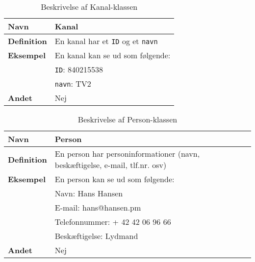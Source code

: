 \begin{table}[H]
    \begin{tabularx}{\textwidth}{|>{\RaggedRight}p{3cm}|>{\RaggedRight}X|}
        \hline
        \textbf{Navn} &  Kanal\\
        \hline
        \textbf{Definition} & En kanal har et \texttt{ID} og et \texttt{navn}\\
        \hline
        \textbf{Eksempel} & En kanal kan se ud som følgende: \\
                          & \texttt{ID}: 840215538\\
                          & \texttt{navn}: TV2\\
        \hline
        \textbf{Andet} & Nej\\
        \hline
    \end{tabularx}
    \caption{Beskrivelse af Kanal-klassen}
    \label{tab:channel_class_description}
\end{table}

\begin{table}[H]
    \begin{tabularx}{\textwidth}{|>{\RaggedRight}p{3cm}|>{\RaggedRight}X|}
        \hline
        \textbf{Navn} &  Person\\
        \hline
        \textbf{Definition} &  En person har personinformationer (navn, beskæftigelse, e-mail, tlf.nr. osv)\\
        \hline
        \textbf{Eksempel} & En person kan se ud som følgende: \\
                          & Navn: Hans Hansen\\
                          & E-mail: hans@hansen.pm\\
                          & Telefonnummer: + 42 42 06 96 66\\
                          & Beskæftigelse: Lydmand\\
        \hline
        \textbf{Andet} & Nej\\
        \hline
    \end{tabularx}
    \caption{Beskrivelse af Person-klassen}
    \label{tab:person_class_description}
\end{table}